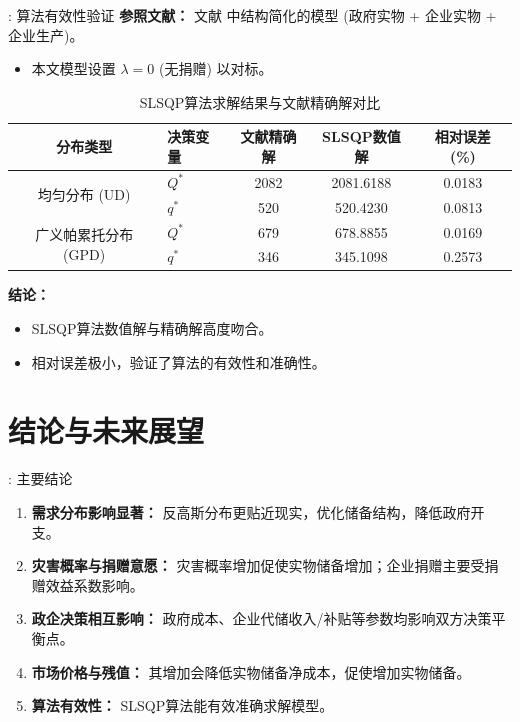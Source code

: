 \documentclass[9pt]{beamer}
\begin{document}
\begin{frame}{\insertsectionhead: 算法有效性验证}
    \textbf{参照文献：} 文献 \cite{LIY2023} 中结构简化的模型 (政府实物 + 企业实物 + 企业生产)。
    \begin{itemize}
        \item 本文模型设置 $\lambda=0$ (无捐赠) 以对标。
    \end{itemize}
    \begin{table}
    \centering
    \caption{SLSQP算法求解结果与文献精确解对比}
    \small
    \begin{tabular}{clccc}
    \toprule
    分布类型 & 决策变量 & 文献精确解 & SLSQP数值解 & 相对误差 (\%) \\
    \midrule
    \multirow{2}{*}{均匀分布 (UD)} & $Q^*$ & 2082 & 2081.6188 & 0.0183 \\
    & $q^*$ & 520  & 520.4230  & 0.0813 \\
    \midrule
    \multirow{2}{*}{广义帕累托分布 (GPD)} & $Q^*$ & 679 & 678.8855 & 0.0169 \\
    & $q^*$ & 346 & 345.1098 & 0.2573 \\
    \bottomrule
    \end{tabular}
    \end{table}
    \textbf{结论：}
    \begin{itemize}
        \item SLSQP算法数值解与精确解高度吻合。
        \item 相对误差极小，验证了算法的有效性和准确性。
    \end{itemize}
\end{frame}

\section{结论与未来展望}
\begin{frame}{\insertsectionhead: 主要结论}
    \begin{enumerate}
        \item \textbf{需求分布影响显著：} 反高斯分布更贴近现实，优化储备结构，降低政府开支。
        \item \textbf{灾害概率与捐赠意愿：} 灾害概率增加促使实物储备增加；企业捐赠主要受捐赠效益系数影响。
        \item \textbf{政企决策相互影响：} 政府成本、企业代储收入/补贴等参数均影响双方决策平衡点。
        \item \textbf{市场价格与残值：} 其增加会降低实物储备净成本，促使增加实物储备。
        \item \textbf{算法有效性：} SLSQP算法能有效准确求解模型。
    \end{enumerate}
\end{frame}
\end{document}
